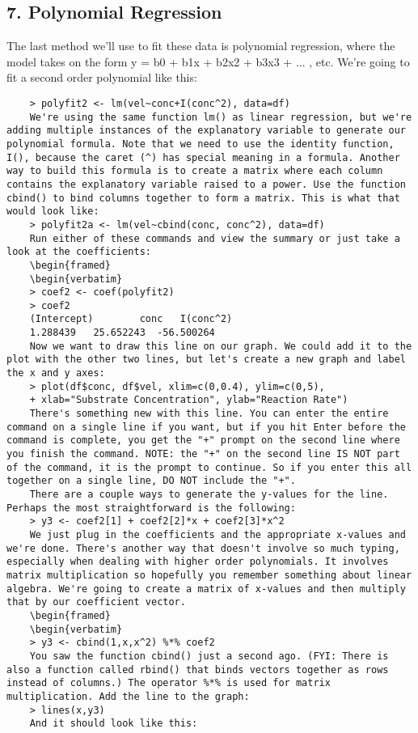 \subsection*{7. Polynomial Regression}


The last method we'll use to fit these data is polynomial regression, where the model takes on the form y = b0 + b1x + b2x2 + b3x3 + ... , etc. We're going to fit a second order polynomial like this: 
\begin{framed}
	\begin{verbatim}
	> polyfit2 <- lm(vel~conc+I(conc^2), data=df)
	We're using the same function lm() as linear regression, but we're adding multiple instances of the explanatory variable to generate our polynomial formula. Note that we need to use the identity function, I(), because the caret (^) has special meaning in a formula. Another way to build this formula is to create a matrix where each column contains the explanatory variable raised to a power. Use the function cbind() to bind columns together to form a matrix. This is what that would look like: 
	> polyfit2a <- lm(vel~cbind(conc, conc^2), data=df)
	Run either of these commands and view the summary or just take a look at the coefficients: 
	\begin{framed}
	\begin{verbatim}
	> coef2 <- coef(polyfit2)
	> coef2
	(Intercept)        conc   I(conc^2) 
	1.288439   25.652243  -56.500264 
	Now we want to draw this line on our graph. We could add it to the plot with the other two lines, but let's create a new graph and label the x and y axes: 
	> plot(df$conc, df$vel, xlim=c(0,0.4), ylim=c(0,5), 
	+ xlab="Substrate Concentration", ylab="Reaction Rate")
	There's something new with this line. You can enter the entire command on a single line if you want, but if you hit Enter before the command is complete, you get the "+" prompt on the second line where you finish the command. NOTE: the "+" on the second line IS NOT part of the command, it is the prompt to continue. So if you enter this all together on a single line, DO NOT include the "+". 
	There are a couple ways to generate the y-values for the line. Perhaps the most straightforward is the following: 
	> y3 <- coef2[1] + coef2[2]*x + coef2[3]*x^2
	We just plug in the coefficients and the appropriate x-values and we're done. There's another way that doesn't involve so much typing, especially when dealing with higher order polynomials. It involves matrix multiplication so hopefully you remember something about linear algebra. We're going to create a matrix of x-values and then multiply that by our coefficient vector. 
	\begin{framed}
	\begin{verbatim}
	> y3 <- cbind(1,x,x^2) %*% coef2
	You saw the function cbind() just a second ago. (FYI: There is also a function called rbind() that binds vectors together as rows instead of columns.) The operator %*% is used for matrix multiplication. Add the line to the graph: 
	> lines(x,y3)
	And it should look like this: 
	

\end{verbatim}
\end{framed}
